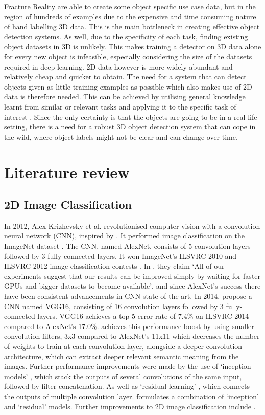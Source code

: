 \documentclass[11pt]{article}
\begin{document}
Fracture Reality are able to create some object specific use case data, but in the region of hundreds of examples due to the expensive and time consuming nature of hand labelling 3D data. This is the main bottleneck in creating effective object detection systems. As well, due to the specificity of each task, finding existing object datasets in 3D is unlikely. This makes training a detector on 3D data alone for every new object is infeasible, especially considering the size of the datasets required in deep learning. 2D data however is more widely abundant and relatively cheap and quicker to obtain. The need for a system that can detect objects given as little training examples as possible which also makes use of 2D data is therefore needed. This can be achieved by utilising general knowledge learnt from similar or relevant tasks and applying it to the specific task of interest \cite{DeCAF}. Since the only certainty is that the objects are going to be in a real life setting, there is a need for a robust 3D object detection system that can cope in the wild, where object labels might not be clear and can change over time.


\section{Literature review}
\subsection*{2D Image Classification}
In 2012, Alex Krizhevsky et al. revolutionised computer vision with a convolution neural network (CNN), inspired by \cite{Yann}. It performed image classification on the ImageNet dataset \cite{ILSVRC15}. The CNN, named AlexNet, consists of 5 convolution layers followed by 3 fully-connected layers. It won ImageNet's ILSVRC-2010 and ILSVRC-2012 image classification contests \cite{alex_net}. In \cite{alex_net}, they claim `All of our experiments suggest that our results can be improved simply by waiting for faster GPUs and bigger datasets to become available', and since AlexNet's success there have been consistent advancements in CNN state of the art. In 2014, \cite{VGG16} propose a CNN named VGG16, consisting of 16 convolution layers followed by 3 fully-connected layers. VGG16 achieves a top-5 error rate of 7.4\% on ILSVRC-2014 compared to AlexNet's 17.0\%. \cite{VGG16} achieves this performance boost by using smaller convolution filters, 3x3 compared to AlexNet's 11x11 which decreases the number of weights to train at each convolution layer, alongside a deeper convolution architecture, which can extract deeper relevant semantic meaning from the images. Further performance improvements were made by the use of `inception models' \cite{inception}\cite{inceptionV2}, which stack the outputs of several convolutions of the same input, followed by filter concatenation. As well as `residual learning' \cite{ResNet}, which connects the outputs of multiple convolution layer. \cite{Incep_ResNet} formulates a combination of `inception' and `residual' models. Further improvements to 2D image classification include \cite{neural_search} \cite{scaleable_image}.
\end{document}

